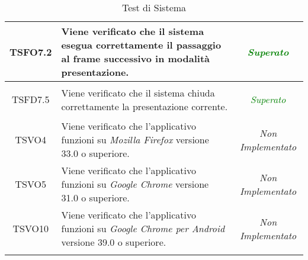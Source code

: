 \begin{longtable}{|c|>{}m{8cm}|c|}
\hypertarget{TSFO7.2}{TSFO7.2} & Viene verificato che il sistema esegua correttamente il passaggio al frame successivo in modalità presentazione. & \textcolor{Green}{\textit{Superato}}\\ \hline
\hypertarget{TSFD7.5}{TSFD7.5} & Viene verificato che il sistema chiuda correttamente la presentazione corrente. & \textcolor{Green}{\textit{Superato}}\\ \hline
\hypertarget{TSVO4}{TSVO4} & Viene verificato che l’applicativo funzioni su \textit{Mozilla Firefox} versione 33.0 o superiore. & \textit{Non Implementato}\\ \hline
\hypertarget{TSVO5}{TSVO5} & Viene verificato che l’applicativo funzioni su \textit{Google Chrome} versione 31.0 o superiore. & \textit{Non Implementato}\\ \hline
\hypertarget{TSVO10}{TSVO10} & Viene verificato che l’applicativo funzioni su \textit{Google Chrome per Android} versione 39.0 o superiore. & \textit{Non Implementato}\\ \hline
\caption[Test di Sistema]{Test di Sistema}
\label{tabella:test1}
\end{longtable}
\clearpage

